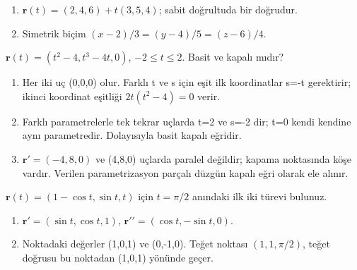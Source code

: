 \begin{tcolorbox}[title={Adım adım çözüm},colback=green!3!white,colframe=green]\begin{enumerate}
\item \(\mathbf r(t)=(2,4,6)+t(3,5,4)\); sabit doğrultuda bir doğrudur.
\item Simetrik biçim \((x-2)/3=(y-4)/5=(z-6)/4\).
\end{enumerate}\end{tcolorbox}
\begin{tcolorbox}[title={Örnek 3.19 | Kapalı eğri ve uç teğetler},colframe=accent]\(\mathbf r(t)=(t^2-4,t^3-4t,0)\), \(-2\le t\le2\). Basit ve kapalı mıdır?
\par{}\end{tcolorbox}
\begin{tcolorbox}[title={Adım adım çözüm},colback=green!3!white,colframe=green]\begin{enumerate}
\item Her iki uç (0,0,0) olur. Farklı t ve s için eşit ilk koordinatlar s=-t gerektirir; ikinci koordinat eşitliği \(2t(t^2-4)=0\) verir.
\item Farklı parametrelerle tek tekrar uçlarda t=2 ve s=-2 dir; t=0 kendi kendine aynı parametredir. Dolayısıyla basit kapalı eğridir.
\item \(\mathbf r\prime=(-4,8,0)\) ve (4,8,0) uçlarda paralel değildir; kapama noktasında köşe vardır. Verilen parametrizasyon parçalı düzgün kapalı eğri olarak ele alınır.
\end{enumerate}\end{tcolorbox}
\begin{tcolorbox}[title={Örnek 3.20 | Türev ve ikinci türevin noktadaki değeri},colframe=accent]\(\mathbf r(t)=(1-\cos t,\sin t,t)\) için \(t=\pi/2\) anındaki ilk iki türevi bulunuz.
\par{}\end{tcolorbox}
\begin{tcolorbox}[title={Adım adım çözüm},colback=green!3!white,colframe=green]\begin{enumerate}
\item \(\mathbf r\prime=(\sin t,\cos t,1)\), \(\mathbf r\prime\prime=(\cos t,-\sin t,0)\).
\item Noktadaki değerler (1,0,1) ve (0,-1,0). Teğet noktası \((1,1,\pi/2)\), teğet doğrusu bu noktadan (1,0,1) yönünde geçer.
\end{enumerate}\end{tcolorbox}
